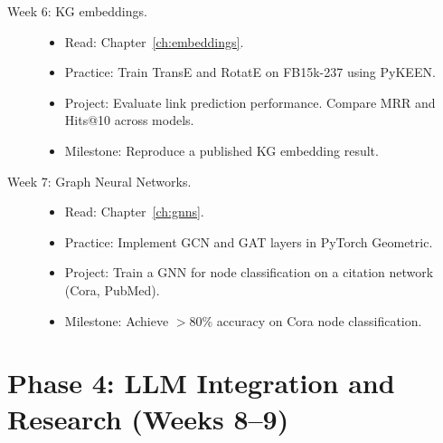 \documentclass[11pt,a4paper,oneside,openany]{book}
\theoremstyle{definition}
\theoremstyle{plain}
\theoremstyle{remark}
\begin{document}
\begin{description}
	\item[Week 6: KG embeddings.]
	      \begin{itemize}
		      \item Read: Chapter~\ref{ch:embeddings}.
		      \item Practice: Train TransE and RotatE on FB15k-237 using PyKEEN.
		      \item Project: Evaluate link prediction performance. Compare MRR and Hits@10 across models.
		      \item Milestone: Reproduce a published KG embedding result.
	      \end{itemize}

	\item[Week 7: Graph Neural Networks.]
	      \begin{itemize}
		      \item Read: Chapter~\ref{ch:gnns}.
		      \item Practice: Implement GCN and GAT layers in PyTorch Geometric.
		      \item Project: Train a GNN for node classification on a citation network (Cora, PubMed).
		      \item Milestone: Achieve $>$80\% accuracy on Cora node classification.
	      \end{itemize}
\end{description}

\section{Phase 4: LLM Integration and Research (Weeks 8--9)}\label{sec:phase4}
\end{document}
